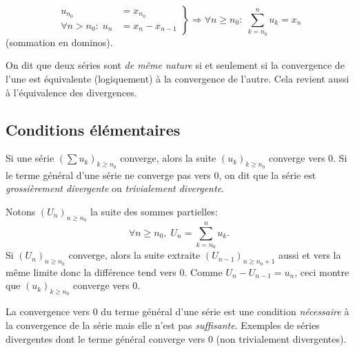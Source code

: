 \begin{displaymath}
\left. 
\begin{aligned}
  u_{n_0} &= x_{n_0}\\
  \forall n > n_0:\; u_{n} &= x_n - x_{n-1}  
\end{aligned}
\right\rbrace \Rightarrow
\forall n \geq n_0: \;\sum_{k=n_0}^{n}u_k = x_n
\end{displaymath}
(sommation en dominos).
\newpage
\begin{defi}
  On dit que deux séries sont \emph{de même nature} si et seulement si la convergence de l'une est équivalente (logiquement) à la convergence de l'autre. Cela revient aussi à l'équivalence des divergences. 
\end{defi}
\clearpage

\subsection{Conditions élémentaires}
\begin{prop}
  Si une série $\left( \sum u_k\right)_{k\geq n_0} $ converge, alors la suite $(u_k)_{k\geq n_0}$ converge vers $0$. Si le terme général d'une série ne converge pas vers $0$, on dit que la série est \emph{grossièrement divergente} ou \emph{trivialement divergente}.
\end{prop}
\begin{demo}
  Notons $(U_n)_{n\geq n_0}$ la suite des sommes partielles: 
\[
\forall n \geq n_0, \; U_n = \sum_{k=n_0}^{n}u_k.  
\]
Si $(U_n)_{n\geq n_0}$ converge, alors la suite extraite $(U_{n-1})_{n\geq n_0 +1}$ aussi et vers la même limite donc la différence tend vers $0$.\newline
Comme $U_n-U_{n-1}=u_n$, ceci montre que $(u_k)_{k\geq n_0}$ converge vers $0$.
\end{demo}
\newpage
La convergence vers $0$ du terme général d'une série est une condition \emph{nécessaire} à la convergence de la série mais elle n'est pas \emph{suffisante}.\newline
Exemples de séries divergentes dont le terme général converge vers $0$ (non trivialement divergentes).
